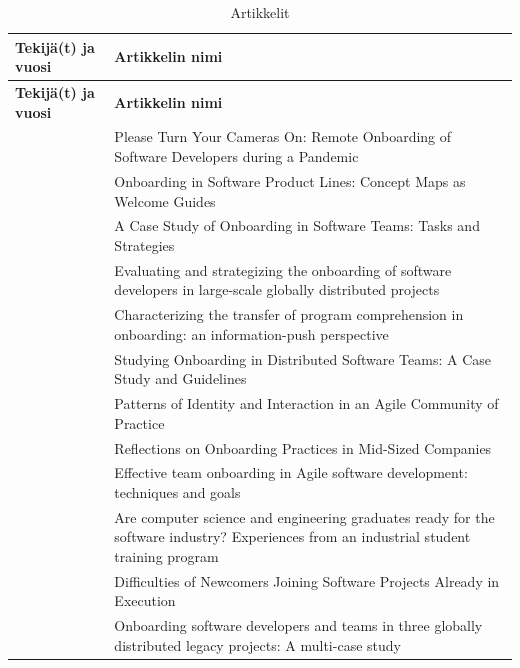 \documentclass[utf8]{gradu3}
\begin{document}
\begin{footnotesize}
    \begin{longtable}{ m{4cm}  m{10.5cm} }
    \hline
        \hline
           \textbf{Tekijä(t) ja vuosi} & \textbf{Artikkelin nimi} \\
        \hline
    \endfirsthead

    \hline
        \hline
           \textbf{Tekijä(t) ja vuosi} & \textbf{Artikkelin nimi} \\
        \hline
    \endhead
 \hline
 \endfoot

 \caption{Artikkelit \label{tbl:artikkelit}}
 \endlastfoot

\textcite{rodeghero-ym-2021} & Please Turn Your Cameras On: Remote Onboarding of Software Developers during a Pandemic \\
\hline
\textcite{azanza-ym-2021} & Onboarding in Software Product Lines: Concept Maps as Welcome Guides \\
\hline
\textcite{ju-ym-2021} & A Case Study of Onboarding in Software Teams: Tasks and Strategies \\
\hline
\textcite{britto-ym-2020} & Evaluating and strategizing the onboarding of software developers in large-scale globally distributed projects\\
\hline
\textcite{yates-ym-2020} & Characterizing the transfer of program comprehension in onboarding: an information-push perspective\\
\hline
\textcite{moe-ym-2020} & Studying Onboarding in Distributed Software Teams: A Case Study and Guidelines \\
\hline
\textcite{kumar-wallace-2019} & Patterns of Identity and Interaction in an Agile Community of Practice \\
\hline
\textcite{viviani-murphy-2019} & Reflections on Onboarding Practices in Mid-Sized Companies \\
\hline
\textcite{buchan-ym-2019} & Effective team onboarding in Agile software development: techniques and goals \\
\hline
\textcite{tuzun-ym-2018} & Are computer science and engineering graduates ready for the software industry? Experiences from an industrial student training program \\
\hline
\textcite{matturro-ym-2017} & Difficulties of Newcomers Joining Software Projects Already in Execution \\
\hline
\textcite{britto-ym-2017} & Onboarding software developers and teams in three globally distributed legacy projects: A multi-case study \\

\end{longtable}
\end{footnotesize}
\end{document}
